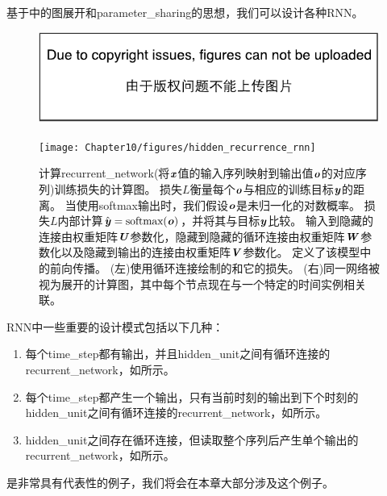 \section{}
\label{sec:recurrent_neural_networks}
基于中的图展开和\gls{parameter_sharing}的思想，我们可以设计各种\gls{RNN}。
\begin{figure}[!htb]
\ifOpenSource
\centerline{\includegraphics{figure.pdf}}
\else
\centerline{\texttt{[image: Chapter10/figures/hidden\_recurrence\_rnn]}}
\fi
\caption{计算\gls{recurrent_network}(将$\boldsymbol{\mathit{x}}$值的输入序列映射到输出值$\boldsymbol{\mathit{o}}$的对应序列)训练损失的计算图。
损失$L$衡量每个$\boldsymbol{\mathit{o}}$与相应的训练目标$\boldsymbol{\mathit{y}}$的距离。
当使用softmax输出时，我们假设$\boldsymbol{\mathit{o}}$是未归一化的对数概率。
损失$L$内部计算$\hat{\boldsymbol{\mathit{y}}} = \text{softmax}(\boldsymbol{\mathit{o}})$，并将其与目标$\boldsymbol{\mathit{y}}$比较。
输入到隐藏的连接由权重矩阵$\boldsymbol{\mathit{U}}$参数化，隐藏到隐藏的循环连接由权重矩阵$\boldsymbol{\mathit{W}}$参数化以及隐藏到输出的连接由权重矩阵$\boldsymbol{\mathit{V}}$参数化。
定义了该模型中的前向传播。
(左)使用循环连接绘制的和它的损失。
(右)同一网络被视为展开的计算图，其中每个节点现在与一个特定的时间实例相关联。
}
\label{fig:chap10_hidden_recurrence_rnn}
\end{figure}

\gls{RNN}中一些重要的设计模式包括以下几种：
\begin{enumerate}
 \item 每个\gls{time_step}都有输出，并且\gls{hidden_unit}之间有循环连接的\gls{recurrent_network}，如所示。
 \item 每个\gls{time_step}都产生一个输出，只有当前时刻的输出到下个时刻的\gls{hidden_unit}之间有循环连接的\gls{recurrent_network}，如所示。
 \item \gls{hidden_unit}之间存在循环连接，但读取整个序列后产生单个输出的\gls{recurrent_network}，如所示。
\end{enumerate}
是非常具有代表性的例子，我们将会在本章大部分涉及这个例子。

